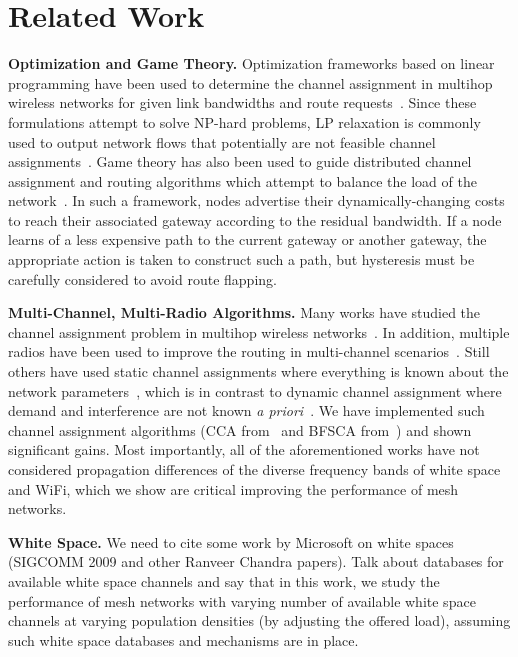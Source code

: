 \section{Related Work}
\label{sec:related}

{\bf Optimization and Game Theory.} Optimization frameworks based on linear programming
have been used to determine the channel assignment in multihop wireless networks for given 
link bandwidths and route requests~\cite{tang2005interference}.  Since these formulations 
attempt to solve NP-hard problems, LP relaxation is commonly used to output network flows 
that potentially are not feasible channel assignments~\cite{FIXME}. 
Game theory has also been used to guide distributed channel assignment and routing 
algorithms which attempt to balance the load of the network~\cite{raniwala2005architecture,
wang2010game}.  In such a framework, nodes advertise their dynamically-changing costs 
to reach their associated gateway according to the residual bandwidth. If a node learns of
a less expensive path to the current gateway or another gateway, the appropriate action is
taken to construct such a path, but hysteresis must be carefully considered to avoid route flapping.

{\bf Multi-Channel, Multi-Radio Algorithms.} Many works have studied the channel assignment problem in multihop wireless
networks~\cite{jain2005impact,akyildiz2005wireless,raniwala2004centralized}.
In addition, multiple radios have been used to improve the routing in multi-channel
scenarios~\cite{draves2004routing}. Still others have used static channel assignments
where everything is known about the network parameters~\cite{subramanian2008minimum},
which is in contrast to dynamic channel assignment where demand and interference are 
not known {\it a priori}~\cite{wu2006analysis,ramachandran2006interference}. 
We have implemented such channel assignment algorithms (CCA from~\cite{draves2004routing} and 
BFSCA from~\cite{ramachandran2006interference}) and shown significant gains.  
Most importantly, all of the aforementioned works have not considered propagation 
differences of the diverse frequency bands of white space and WiFi, which we show are 
critical improving the performance of mesh networks.

{\bf White Space.} We need to cite some work by Microsoft on white spaces (SIGCOMM 2009 and other
Ranveer Chandra papers).  Talk about databases for available white space channels and say that 
in this work, we study the performance of mesh networks with varying number of available white 
space channels at varying population densities (by adjusting the offered load), assuming such 
white space databases and mechanisms are in place.

